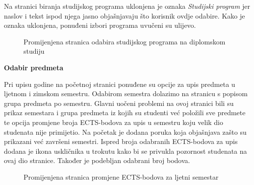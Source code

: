 \documentclass[times, utf8, zavrsni, numeric]{fer}
\begin{document}
        Na stranici biranja studijskog programa uklonjena je oznaka \textit{Studijski program} jer naslov i tekst ispod njega jasno objašnjavaju što korisnik ovdje odabire. Kako je oznaka uklonjena, ponuđeni izbori programa uvučeni su ulijevo.
        
        \begin{figure} [H]
          \centering
          \caption{Promijenjena stranica odabira studijskog programa na diplomskom studiju}
        \end{figure}

        
        \noindent\textbf{Odabir predmeta}
        
        Pri upisu godine na početnoj stranici ponuđene su opcije za upis predmeta u ljetnom i zimskom semestru. Odabirom semestra dolazimo na stranicu s popisom grupa predmeta po semestru. Glavni uočeni problemi na ovoj stranici bili su prikaz semestara i grupa predmeta iz kojih su studenti već položili sve predmete te opcija promjene broja ECTS-bodova za upis u semestru koju velik dio studenata nije primijetio. Na početak je dodana poruka koja objašnjava zašto su prikazani već završeni semestri. Ispred broja odabranih ECTS-bodova za upis dodana je ikona uskličnika u trokutu kako bi se privukla pozornost studenata na ovaj dio stranice. Također je podebljan odabrani broj bodova.
        
        \begin{figure} [H]
          \centering
          \caption{Promijenjena stranica promjene ECTS-bodova za ljetni semestar}
        \end{figure}
        
\end{document}

